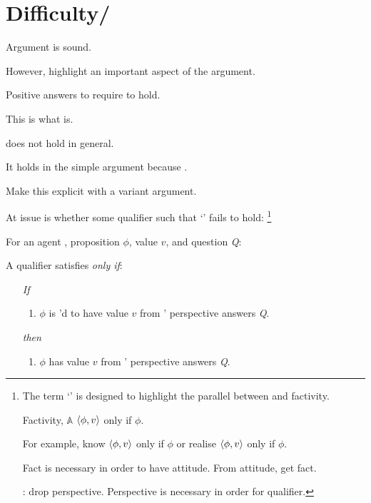 \section{Difficulty/}
\label{cha:zSpA:sec:difficulty}
\label{cha:zSpA:ptivity}


\begin{note}
  Argument is sound.

  However, highlight an important aspect of the argument.

  Positive answers to \qzS{} require \ptivity{} to hold.

  This is what \ptivity{} is.

  \ptivity{} does not hold in general.

  It holds in the simple argument because \qzS{}.

  Make this explicit with a variant argument.
\end{note}

\begin{note}
  At issue is whether some qualifier such that `\emph{}' fails to hold:%
  \footnote{
    The term `\emph{}' is designed to highlight the parallel between \emph{} and factivity.

    Factivity, \(\mathbb{A}\) \(\langle \phi, v \rangle\) only if \(\phi\).

    For example, know \(\langle \phi, v \rangle\) only if \(\phi\) or realise \(\langle \phi, v \rangle\) only if \(\phi\).

    Fact is necessary in order to have attitude.
    From attitude, get fact.

    : drop perspective.
    Perspective is necessary in order for qualifier.
  }

  \begin{principle}[\ptivity{2}]
    \label{def:perspectivity}
    For an agent \vAgent{}, proposition \(\phi\), value \(v\), and question \emph{Q}:

    A qualifier \ptivityQV{} satisfies \ptivity{} \emph{only if}:

    \begin{enumerate}[noitemsep]
    \item[\emph{If}]
      \begin{enumerate}[label=\alph*., ref=(\alph*)]
      \item
        \(\phi\) is \ptivityQV{}'d to have value \(v\) from \vAgent{}' perspective answers \emph{Q}.
      \end{enumerate}
    \item[\emph{then}]
      \begin{enumerate}[label=\alph*., ref=(\alph*), resume]
      \item
        \(\phi\) has value \(v\) from \vAgent{}' perspective answers \emph{Q}.
      \end{enumerate}
    \end{enumerate}
    \vspace{-\baselineskip}
  \end{principle}
\end{note}

